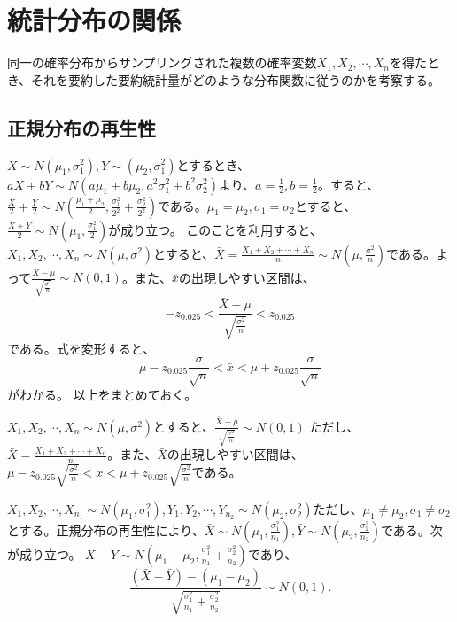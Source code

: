 \section{統計分布の関係}
同一の確率分布からサンプリングされた複数の確率変数$X_1,X_2,\cdots,X_n$を得たとき、それを要約した要約統計量がどのような分布関数に従うのかを考察する。

\subsection{正規分布の再生性}
$X \sim N(\mu_1,\sigma^2_1),Y\sim(\mu_2,\sigma^2_1)$とするとき、$aX+bY \sim N(a\mu_1+b\mu_2,a^2\sigma^2_1+b^2\sigma^2_2)$より、$a=\frac{1}{2},b=\frac{1}{2}$。すると、$\frac{X}{2}+\frac{Y}{2}\sim N(\frac{\mu_1+\mu_2}{2},\frac{\sigma^2_1}{2^2}+\frac{\sigma^2_2}{2^2})$である。$\mu_1=\mu_2,\sigma_1=\sigma_2$とすると、$\frac{X+Y}{2}\sim N(\mu_1,\frac{\sigma^2_1}{2})$が成り立つ。
このことを利用すると、$X_1,X_2,\cdots,X_n\sim N(\mu,\sigma^2)$とすると、$\bar{X}=\frac{X_1+X_2+\cdots+X_n}{n}\sim N(\mu,\frac{\sigma^2}{n})$である。よって$\frac{\bar{X}-\mu}{\sqrt{\frac{\sigma^2}{n}}}\sim N(0,1) $。また、$\bar{x}$の出現しやすい区間は、
\begin{equation*}
    -z_{0.025}<\frac{\bar{X}-\mu}{\sqrt{\frac{\sigma^2}{n}}} < z_{0.025}
\end{equation*}
である。式を変形すると、
\begin{equation*}
    \mu-z_{0.025}\frac{\sigma}{\sqrt{n}}<\bar{x}<\mu+z_{0.025}\frac{\sigma}{\sqrt{n}}
\end{equation*}
がわかる。
以上をまとめておく。

\begin{theo}
    $X_1,X_2,\cdots,X_n \sim N(\mu,\sigma^2)$とすると、$\frac{\bar{X}-\mu}{\sqrt{\frac{\sigma^2}{n}}}\sim N(0,1)$ ただし、$\bar{X}=\frac{X_1+X_2+\cdots+X_n}{n}$。また、$\bar{X}$の出現しやすい区間は、$\mu-z_{0.025}\sqrt{\frac{\sigma^2}{n}}<\bar{x}<\mu+z_{0.025}\sqrt{\frac{\sigma^2}{n}}$である。
\end{theo}



\begin{theo}
    $X_1,X_2,\cdots,X_{n_1} \sim N(\mu_1,\sigma_1^2),Y_1,Y_2,\cdots,Y_{n_2}\sim N(\mu_2,\sigma_2^2)$ただし、$\mu_1\neq \mu_2,\sigma_1\neq \sigma_2$とする。正規分布の再生性により、$\bar{X}\sim N(\mu_1,\frac{\sigma^2_1}{n_1}),\bar{Y}\sim N(\mu_2,\frac{\sigma^2_2}{n_2})$である。次が成り立つ。
    $\bar{X}-\bar{Y} \sim N(\mu_1-\mu_2,\frac{\sigma^2_1}{n_1}+\frac{\sigma^2_2}{n_2})$であり、
    \begin{equation*}
        \frac{(\bar{X}-\bar{Y})-(\mu_1-\mu_2)}{\sqrt{\frac{\sigma_1^2}{n_1}+ \frac{\sigma_2^2}{n_2}}}\sim N(0,1).
    \end{equation*}
\end{theo}



